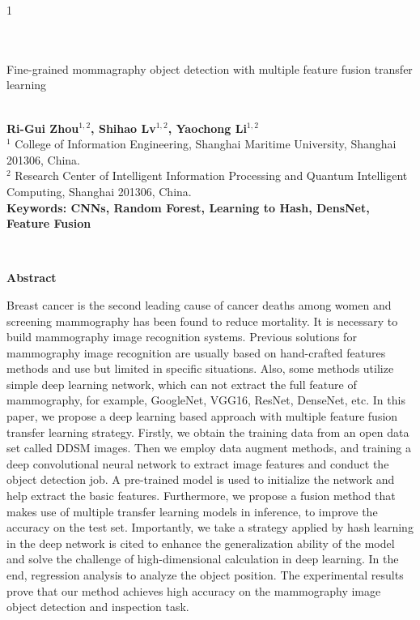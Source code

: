 \documentclass[12pt]{article}
\begin{document}
\hspace{13.9cm}1

\ \vspace{20mm}\\\\

{\LARGE Fine-grained mommagraphy object detection with multiple feature fusion transfer learning}

\ \\
{\bf \large 
  Ri-Gui Zhou$^{\displaystyle 1, \displaystyle 2}$,
  Shihao Lv$^{\displaystyle 1, \displaystyle 2}$,
  Yaochong Li$^{\displaystyle 1, \displaystyle 2}$
}\\
{$^{\displaystyle 1}$ College of Information Engineering, Shanghai Maritime University, Shanghai 201306, China.}\\
{$^{\displaystyle 2}$ Research Center of Intelligent Information Processing and Quantum Intelligent Computing, Shanghai 201306,
China.}\\
%

{\bf Keywords: CNNs, Random Forest, Learning to Hash, DensNet, Feature Fusion} 

\thispagestyle{empty}
%
\ \vspace{-0mm}\\
%
\begin{center} {\bf Abstract} \end{center}
Breast cancer is the second leading cause of 
cancer deaths among women and screening 
mammography has been found to reduce 
mortality. It is necessary to build 
mammography image recognition systems. 
Previous solutions for mammography image 
recognition are usually based on hand-crafted 
features methods and use but limited in 
specific situations. Also, some methods 
utilize simple deep learning network, which 
can not extract the full feature of mammography,
for example, GoogleNet, VGG16, ResNet, DenseNet, etc.
In this paper, we propose a deep learning based 
approach with multiple feature fusion transfer 
learning strategy. Firstly, we obtain the 
training data from an open data set called 
DDSM images. Then we employ data augment 
methods, and training a deep convolutional 
neural network to extract image features and 
conduct the object detection job. 
A pre-trained model is used to initialize the 
network and help extract the basic features.
Furthermore, we propose a fusion method that 
makes use of multiple transfer learning models 
in inference, to improve the accuracy on the 
test set. Importantly, we take a strategy 
applied by hash learning in the deep network 
is cited to enhance the generalization ability 
of the model and solve the challenge of 
high-dimensional calculation in deep learning. 
In the end, regression analysis to analyze 
the object position. The experimental results 
prove that our method achieves high accuracy on 
the mammography image object detection 
and inspection task.
\end{document}
